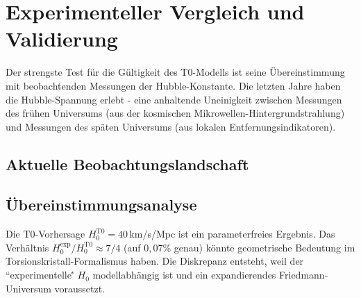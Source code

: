 	\section{Experimenteller Vergleich und Validierung}
	
	Der strengste Test für die Gültigkeit des T0-Modells ist seine Übereinstimmung mit beobachtenden Messungen der Hubble-Konstante. Die letzten Jahre haben die Hubble-Spannung erlebt - eine anhaltende Uneinigkeit zwischen Messungen des frühen Universums (aus der kosmischen Mikrowellen-Hintergrundstrahlung) und Messungen des späten Universums (aus lokalen Entfernungsindikatoren).
	
	\subsection{Aktuelle Beobachtungslandschaft}
	
	\begin{table}[htbp]
		\caption{Vergleich der T0-Vorhersage mit experimentellen Messungen}
		\label{tab:h0_comparison}
	\end{table}
	
	\subsection{Übereinstimmungsanalyse}
	
	Die T0-Vorhersage $H_0^{\text{T0}} = 40\,$km/s/Mpc ist ein parameterfreies Ergebnis. Das Verhältnis $H_0^{\text{exp}}/H_0^{\text{T0}} \approx 7/4$ (auf $0{,}07\%$ genau) könnte geometrische Bedeutung im Torsionskristall-Formalismus haben. Die Diskrepanz entsteht, weil der ``experimentelle\'\' $H_0$ modellabhängig ist und ein expandierendes Friedmann-Universum voraussetzt.
	
